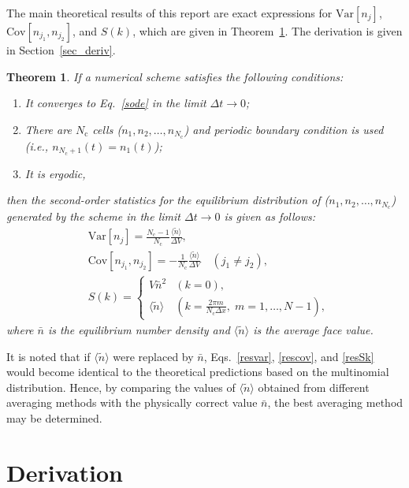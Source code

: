 \documentclass{article}
\newtheorem{theorem}{Theorem}
\newcommand{\Var}{\mathrm{Var}}
\newcommand{\Cov}{\mathrm{Cov}}
\newcommand{\dx}{{\Delta x}}
\newcommand{\dt}{{\Delta t}}
\newcommand{\dV}{{\Delta V}}
\newcommand{\avgntilde}{{\langle\tilde{n}\rangle}}
\newcommand{\Nc}{{N_\mathrm{c}}}
\newcommand{\nb}{\bar{n}}
\begin{document}
The main theoretical results of this report are exact expressions for $\Var[n_j]$, $\Cov[n_{j_1},n_{j_2}]$, and $S(k)$, which are given in Theorem~\ref{mainres}.
The derivation is given in Section~\ref{sec_deriv}.

\begin{theorem}
\label{mainres}
If a numerical scheme satisfies the following conditions:
\begin{enumerate}
\item It converges to Eq.~\eqref{sode} in the limit $\dt\rightarrow0$;
\item There are $\Nc$ cells ($n_1,n_2,\dots,n_\Nc$) and periodic boundary condition is used (i.e., $n_{\Nc+1}(t)=n_1(t)$);
\item It is ergodic,
\end{enumerate}
then the second-order statistics for the equilibrium distribution of ($n_1,n_2,\dots,n_\Nc$) generated by the scheme in the limit $\dt\rightarrow0$ is given as follows:
\begin{align}
\label{resvar}
&\Var[n_j]=\frac{\Nc-1}{\Nc}\frac{\avgntilde}{\dV},\\
\label{rescov}
&\Cov[n_{j_1},n_{j_2}]=-\frac{1}{\Nc}\frac{\avgntilde}{\dV}\quad(j_1\ne j_2),\\
\label{resSk}
&S(k)=
\begin{cases}
V\nb^2 & (k=0),\\
\avgntilde & \left(k={\displaystyle\frac{2\pi m}{\Nc\dx}},\;m=1,\dots,N-1\right),
\end{cases}
\end{align} 
where $\nb$ is the equilibrium number density and $\avgntilde$ is the average face value.
\end{theorem}

It is noted that if $\avgntilde$ were replaced by $\nb$, Eqs.~\eqref{resvar}, \eqref{rescov}, and \eqref{resSk} would become identical to the theoretical predictions based on the multinomial distribution.
Hence, by comparing the values of $\avgntilde$ obtained from different averaging methods with the physically correct value $\nb$, the best averaging method may be determined.

\section{\label{sec_deriv}Derivation}
\end{document}

